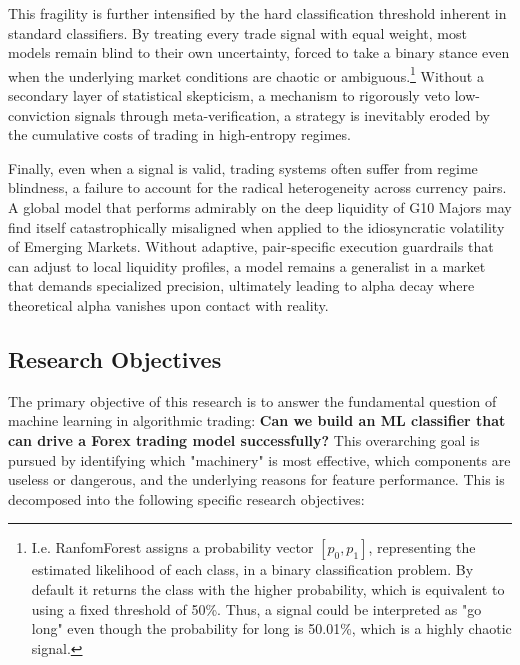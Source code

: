 \documentclass[12pt, a4paper]{article}
\begin{document}
\medskip

This fragility is further intensified by the hard classification threshold inherent in standard classifiers.
By treating every trade signal with equal weight, most models remain blind to their own uncertainty, forced to take a binary stance
even when the underlying market conditions are chaotic or ambiguous.\footnote{I.e. RanfomForest assigns a probability vector $[p_0, p_1]$, representing the 
estimated likelihood of each class, in a binary classification problem. By default it returns the class with the higher probability, which is equivalent to 
using a fixed threshold of 50\%. Thus, a signal could be interpreted as "go long" even though the probability for long is 50.01\%, which is a highly chaotic signal.} 
Without a secondary layer of statistical skepticism, a mechanism to rigorously veto low-conviction signals through meta-verification, 
a strategy is inevitably eroded by the cumulative costs of trading in high-entropy regimes.

\medskip

Finally, even when a signal is valid, trading systems often suffer from regime blindness, a failure to account for the radical heterogeneity across currency pairs. 
A global model that performs admirably on the deep liquidity of G10 Majors may find itself catastrophically misaligned when applied to the 
idiosyncratic volatility of Emerging Markets.
Without adaptive, pair-specific execution guardrails that can adjust to local liquidity profiles, a model remains a
generalist in a market that demands specialized precision, ultimately leading to alpha decay where theoretical alpha vanishes upon contact with reality.


\subsection{Research Objectives}\label{sec:research_objectives}

The primary objective of this research is to answer the fundamental question of machine learning in algorithmic trading: 
\textbf{Can we build an ML classifier that can drive a Forex trading model successfully?}
This overarching goal is pursued by identifying which "machinery" is most effective, which components are useless or dangerous, 
and the underlying reasons for feature performance. This is decomposed into the following specific research objectives:
\end{document}
